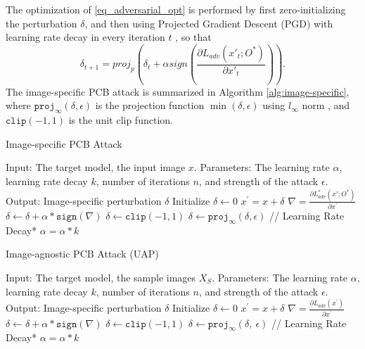 The optimization of \eqref{eq_adversarial_opt} is performed by first zero-initializing the perturbation $\delta$, and then using Projected Gradient Descent (PGD) \cite{madry2017towards} with learning rate decay  in every iteration $t$ , so that 
\begin{equation}
\delta_{t+1} = proj_p(\delta_{t} + \alpha sign(\frac{\partial L_{adv}(x'_{t};O^*)}{\partial x'_{t}} )).
\end{equation}
The image-specific PCB attack is summarized in Algorithm \ref{alg:image-specific}, where 
$\texttt{proj}_{\infty}(\delta,\epsilon)$ is the projection function $\min(\delta,\epsilon)$  using $l_{\infty}$ norm , and $\texttt{clip}(-1, 1)$ is the unit clip function.

\begin{algorithm}
    \caption{Image-specific PCB Attack}\label{alg:image-specific}
    \begin{algorithmic}[1]
        \State Input: The target model, the input image $x$.
        \State Parameters: The learning rate $\alpha$, learning rate decay $k$, number of iterations $n$, and strength of the attack $\epsilon$.
        \State Output: Image-specific perturbation $\delta$
        \State Initialize $\delta \leftarrow 0$
            \State $x^{'} = x + \delta$  
            \State $\nabla = \frac{\partial L_{adv}^*(x';O^*)}{\partial x^{'}}$
            \State $\delta \leftarrow \delta + \alpha * \texttt{sign}(\nabla)$
            \State $\delta \leftarrow \texttt{clip}(-1, 1)$
            \State $\delta \leftarrow  \texttt{proj}_{\infty}(\delta,\epsilon)$ 
            \State // Learning Rate Decay*
            \State $\alpha = \alpha * k$ %
        \EndFor
    \end{algorithmic}
\end{algorithm}

\begin{algorithm}
    \caption{Image-agnostic PCB Attack (UAP)}\label{alg:image-agnostic}
    \begin{algorithmic}[1]
        \State Input: The target model, the sample images $X_S$.
        \State Parameters: The learning rate $\alpha$, learning rate decay $k$, number of iterations $n$, and strength of the attack $\epsilon$.
        \State Output: Image-specific perturbation $\delta$
        \State Initialize $\delta \leftarrow 0$
                \State $x^{'} = x + \delta$  
                \State $\nabla = \frac{\partial L_{adv}(x^{'})}{\partial x^{'}}$
                \State $\delta \leftarrow \delta + \alpha * \texttt{sign}(\nabla)$ %
                \State $\delta \leftarrow \texttt{clip}(-1, 1)$
                \State $\delta \leftarrow  \texttt{proj}_{\infty}(\delta,\ \epsilon)$ 
            \EndFor
        \State // Learning Rate Decay*
        \State $\alpha = \alpha * k$
        \EndFor
    \end{algorithmic}
\end{algorithm}

